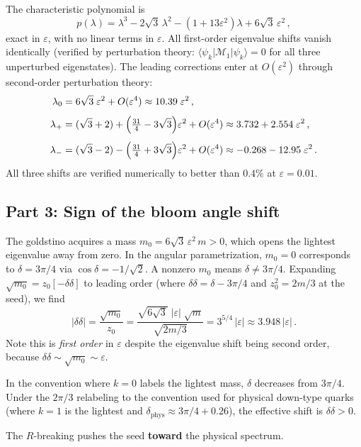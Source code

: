\documentclass[12pt]{article}
\begin{document}
The characteristic polynomial is
$$
p(\lambda) = \lambda^3 - 2\sqrt{3}\,\lambda^2 - (1 + 13\varepsilon^2)\lambda + 6\sqrt{3}\,\varepsilon^2\,,
$$
exact in $\varepsilon$, with no linear terms in $\varepsilon$. All first-order eigenvalue shifts vanish identically (verified by perturbation theory: $\langle\psi_k|\mathcal{M}_1|\psi_k\rangle = 0$ for all three unperturbed eigenstates). The leading corrections enter at $O(\varepsilon^2)$ through second-order perturbation theory:
\begin{align*}
\lambda_0 &= 6\sqrt{3}\;\varepsilon^2 + O(\varepsilon^4) \approx 10.39\;\varepsilon^2\,,\\[4pt]
\lambda_+ &= (\sqrt{3}+2) + \Bigl(\tfrac{31}{4} - 3\sqrt{3}\Bigr)\varepsilon^2 + O(\varepsilon^4) \approx 3.732 + 2.554\;\varepsilon^2\,,\\[4pt]
\lambda_- &= (\sqrt{3}-2) - \Bigl(\tfrac{31}{4} + 3\sqrt{3}\Bigr)\varepsilon^2 + O(\varepsilon^4) \approx -0.268 - 12.95\;\varepsilon^2\,.
\end{align*}
All three shifts are verified numerically to better than $0.4\%$ at $\varepsilon = 0.01$.

\subsection*{Part 3: Sign of the bloom angle shift}

The goldstino acquires a mass $m_0 = 6\sqrt{3}\,\varepsilon^2\, m > 0$, which opens the lightest eigenvalue away from zero. In the angular parametrization, $m_0 = 0$ corresponds to $\delta = 3\pi/4$ via $\cos\delta = -1/\sqrt{2}$. A nonzero $m_0$ means $\delta \neq 3\pi/4$. Expanding $\sqrt{m_0} = z_0[-\delta\delta]$ to leading order (where $\delta\delta = \delta - 3\pi/4$ and $z_0^2 = 2m/3$ at the seed), we find
$$
|\delta\delta| = \frac{\sqrt{m_0}}{z_0} = \frac{\sqrt{6\sqrt{3}}\;|\varepsilon|\;\sqrt{m}}{\sqrt{2m/3}} = 3^{5/4}\,|\varepsilon| \approx 3.948\,|\varepsilon|\,.
$$
Note this is \emph{first order} in $\varepsilon$ despite the eigenvalue shift being second order, because $\delta\delta \sim \sqrt{m_0} \sim \varepsilon$.

In the convention where $k=0$ labels the lightest mass, $\delta$ decreases from $3\pi/4$. Under the $2\pi/3$ relabeling to the convention used for physical down-type quarks (where $k=1$ is the lightest and $\delta_{\mathrm{phys}} \approx 3\pi/4 + 0.26$), the effective shift is $\delta\delta > 0$.

The $R$-breaking pushes the seed \textbf{toward} the physical spectrum.
\end{document}
